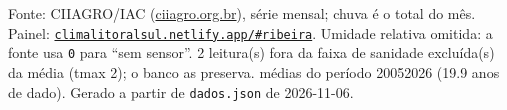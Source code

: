\documentclass[10pt,a4paper]{article}
\begin{document}
\vspace{1pt}
{\tiny\color{cinza}
Fonte: CIIAGRO/IAC (\href{http://ciiagro.org.br}{ciiagro.org.br}), série mensal;
chuva é o total do mês. Painel:
\href{https://climalitoralsul.netlify.app/\#ribeira}%
{\texttt{climalitoralsul.netlify.app/\#ribeira}}.
Umidade relativa omitida: a fonte usa \texttt{0} para ``sem sensor''.  2 leitura(s) fora da faixa de sanidade excluída(s) da média (tmax 2); o banco as preserva.
médias do período 2005\textendash{}2026 (19.9 anos de dado).
Gerado a partir de \texttt{dados.json} de 2026-11-06.}
\end{document}
